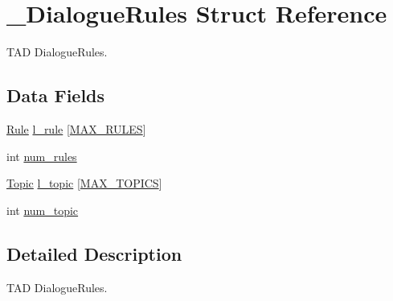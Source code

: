 \hypertarget{struct___dialogue_rules}{\section{\+\_\+\+Dialogue\+Rules Struct Reference}
\label{struct___dialogue_rules}
}


T\+A\+D Dialogue\+Rules.  


\subsection*{Data Fields}
\begin{DoxyCompactItemize}
\item 
\hyperlink{_reglas__dialogo_8h_a7feb7efbc58c00994d4c633ef22eae8a}{Rule} \hyperlink{struct___dialogue_rules_adcfc73729bed816be4039aa0ce11ad84}{l\+\_\+rule} \mbox{[}\hyperlink{_reglas__dialogo_8h_afcd3f2212725d2cc0d74135e7d25eb34}{M\+A\+X\+\_\+\+R\+U\+L\+E\+S}\mbox{]}
\item 
int \hyperlink{struct___dialogue_rules_aa53169e27c9b915a8e6d9b9bda375702}{num\+\_\+rules}
\item 
\hyperlink{_reglas__dialogo_8h_aa36dab328cdd19261f7bdd87154fab24}{Topic} \hyperlink{struct___dialogue_rules_a213a0f2b7a6e5708697a56b1500eb98d}{l\+\_\+topic} \mbox{[}\hyperlink{_reglas__dialogo_8h_a91bc2cac3c4615c062e7524ba2ea2278}{M\+A\+X\+\_\+\+T\+O\+P\+I\+C\+S}\mbox{]}
\item 
int \hyperlink{struct___dialogue_rules_a8754a41ef66790df944ae9b6081fedde}{num\+\_\+topic}
\end{DoxyCompactItemize}


\subsection{Detailed Description}
T\+A\+D Dialogue\+Rules. 


\begin{DoxyItemize}
\item 
\end{DoxyItemize}

